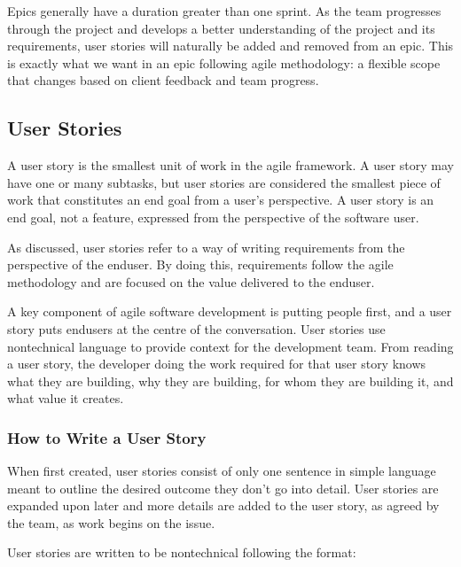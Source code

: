 \documentclass[letterpaper,10pt,english]{jupyterBook}
\begin{document}
\sphinxAtStartPar
Epics generally have a duration greater than one sprint. As the team
progresses through the project and develops a better understanding of
the project and its requirements, user stories will naturally be added
and removed from an epic. This is exactly what we want in an epic
following agile methodology: a flexible scope that changes based on
client feedback and team progress.


\subsection{User Stories}
\label{\detokenize{chapter_1/agile_methodology:user-stories}}
\sphinxAtStartPar
A user story is the smallest unit of work in the agile framework. A user
story may have one or many subtasks, but user stories are considered the
smallest piece of work that constitutes an end goal from a user’s
perspective. A user story is an end goal, not a feature, expressed from
the perspective of the software user.

\sphinxAtStartPar
As discussed, user stories refer to a way of writing requirements from
the perspective of the end\sphinxhyphen{}user. By doing this, requirements follow the
agile methodology and are focused on the value delivered to the
end\sphinxhyphen{}user.

\sphinxAtStartPar
A key component of agile software development is putting people first,
and a user story puts end\sphinxhyphen{}users at the centre of the conversation. User
stories use non\sphinxhyphen{}technical language to provide context for the
development team. From reading a user story, the developer doing the
work required for that user story knows what they are building, why they
are building, for whom they are building it, and what value it creates.


\subsubsection{How to Write a User Story}
\label{\detokenize{chapter_1/agile_methodology:how-to-write-a-user-story}}
\sphinxAtStartPar
When first created, user stories consist of only one sentence in simple
language meant to outline the desired outcome \sphinxhyphen{} they don’t go into
detail. User stories are expanded upon later and more details are added
to the user story, as agreed by the team, as work begins on the issue.

\sphinxAtStartPar
User stories are written to be non\sphinxhyphen{}technical following the format:
\end{document}
